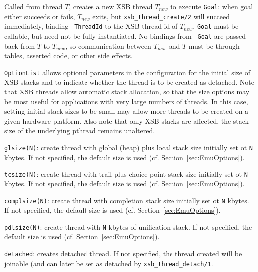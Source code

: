 \begin{description}

%
Called from thread $T$, creates a new XSB thread $T_{new}$ to execute
{\tt Goal}: when goal either succeeds or fails, $T_{new}$ exits, but
{\tt xsb\_thread\_create/2} will succeed immediately, binding {\tt
  ThreadId} to the XSB thread id of $T_{new}$.  {\tt Goal} must be
callable, but need not be fully instantiated.  No bindings from {\tt
  Goal} are passed back from $T$ to $T_{new}$, so communication
between $T_{new}$ and $T$ must be through tables, asserted code, or
other side effects.

{\tt OptionList} allows optional parameters in the configuration for
the initial size of XSB stacks and to indicate whether the thread is
to be created as detached.  Note that XSB threads allow automatic
stack allocation, so that the size options may be most useful for
applications with very large numbers of threads.  In this case,
setting initial stack sizes to be small may allow more threads to be
created on a given hardware platform.  Also note that only XSB stacks
are affected, the stack size of the underlying pthread remains
unaltered.
%
\bi
\item {\tt glsize(N)}: create thread with global (heap) plus local
  stack size initially set ot {\tt N} kbytes.  If not specified, the
  default size is used (cf. Section~\ref{sec:EmuOptions}).
%
\item {\tt tcsize(N)}: create thread with trail plus choice point 
  stack size initially set ot {\tt N} kbytes.  If not specified, the
  default size is used (cf. Section~\ref{sec:EmuOptions}).
%
\item {\tt complsize(N)}: create thread with completion
  stack size initially set ot {\tt N} kbytes. If not specified, the
  default size is used (cf. Section~\ref{sec:EmuOptions}).
%
\item {\tt pdlsize(N)}: create thread with {\tt N} kbytes of
  unification stack.  If not specified, the
  default size is used (cf. Section~\ref{sec:EmuOptions}).
%
\item {\tt detached}: creates detached thread.  If not specified, the
  thread created will be joinable (and can later be set as detached by
  {\tt xsb\_thread\_detach/1}.
\ei


\end{description}
